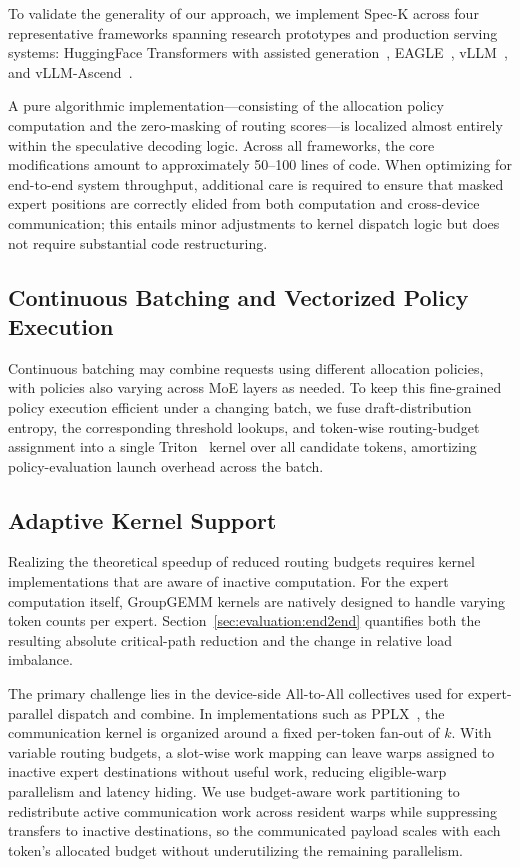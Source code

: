 \documentclass[conference]{IEEEtran}
\theoremstyle{definition} %
\begin{document}
To validate the generality of our approach, we implement Spec-K across four representative frameworks spanning research prototypes and production serving systems: HuggingFace Transformers with assisted generation~\cite{gante2023assistedgeneration}, EAGLE~\cite{li2024eagle}, vLLM~\cite{kwon2023efficient}, and vLLM-Ascend~\cite{huawei2024vllmascend}.

A pure algorithmic implementation---consisting of the allocation policy computation and the zero-masking of routing scores---is localized almost entirely within the speculative decoding logic. Across all frameworks, the core modifications amount to approximately 50--100 lines of code. When optimizing for end-to-end system throughput, additional care is required to ensure that masked expert positions are correctly elided from both computation and cross-device communication; this entails minor adjustments to kernel dispatch logic but does not require substantial code restructuring.

\subsection{Continuous Batching and Vectorized Policy Execution}
\label{sec:implementation:policy-execution}

Continuous batching may combine requests using different allocation policies, with policies also varying across MoE layers as needed. To keep this fine-grained policy execution efficient under a changing batch, we fuse draft-distribution entropy, the corresponding threshold lookups, and token-wise routing-budget assignment into a single Triton~\cite{tillet2019triton} kernel over all candidate tokens, amortizing policy-evaluation launch overhead across the batch.

\subsection{Adaptive Kernel Support}

Realizing the theoretical speedup of reduced routing budgets requires kernel implementations that are aware of inactive computation. For the expert computation itself, GroupGEMM kernels are natively designed to handle varying token counts per expert. Section~\ref{sec:evaluation:end2end} quantifies both the resulting absolute critical-path reduction and the change in relative load imbalance.

The primary challenge lies in the device-side All-to-All collectives used for expert-parallel dispatch and combine. In implementations such as PPLX~\cite{nandor2025pplxkernels}, the communication kernel is organized around a fixed per-token fan-out of $k$. With variable routing budgets, a slot-wise work mapping can leave warps assigned to inactive expert destinations without useful work, reducing eligible-warp parallelism and latency hiding. We use budget-aware work partitioning to redistribute active communication work across resident warps while suppressing transfers to inactive destinations, so the communicated payload scales with each token's allocated budget without underutilizing the remaining parallelism.
\end{document}
